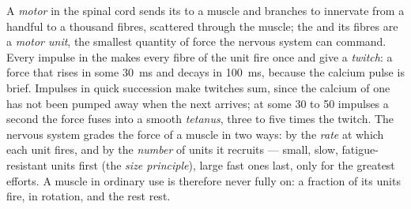 \begin{definition}\label{def:b2:muscle-movement:motorunit}
A \emph{motor } in the spinal cord sends its  to a
muscle and branches to innervate from a handful to a thousand
fibres, scattered through the muscle; the  and its fibres are
a \emph{motor unit}, the smallest quantity of force the nervous
system can command. Every impulse in the  makes every fibre
of the unit fire once and give a \emph{twitch}: a force that rises
in some \qty{30}{ms} and decays in \qty{100}{ms}, because the
calcium pulse is brief. Impulses in quick succession make twitches
sum, since the calcium of one has not been pumped away when the
next arrives; at some 30 to 50 impulses a second the force fuses
into a smooth \emph{tetanus}, three to five times the twitch. The
nervous system grades the force of a muscle in two ways: by the
\emph{rate} at which each unit fires, and by the \emph{number} of
units it recruits --- small, slow, fatigue-resistant units first
(the \emph{size principle}), large fast ones last, only for the
greatest efforts. A muscle in ordinary use is therefore never fully
on: a fraction of its units fire, in rotation, and the rest rest.
\end{definition}

